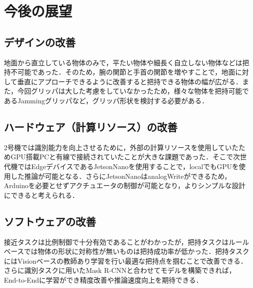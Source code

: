 \section{今後の展望}
\subsection*{デザインの改善}
地面から直立している物体のみで，平たい物体や細長く自立しない物体などは把持不可能であった．そのため，腕の関節と手首の関節を増やすことで，地面に対して垂直にアプローチできるように改善すると把持できる物体の幅が広がる．また，今回グリッパは大した考慮をしていなかったため，様々な物体を把持可能であるJammingグリッパ\cite{jamminggripper}など，グリッパ形状を検討する必要がある．

\subsection*{ハードウェア（計算リソース）の改善}
2号機では識別能力を向上させるために，外部の計算リソースを使用していたためGPU搭載PCと有線で接続されていたことが大きな課題であった．そこで次世代機ではEdgeデバイスであるJetsonNanoを使用することで，localでもGPUを使用した推論が可能となる．さらにJetsonNanoはanalogWriteができるため，Arduinoを必要とせずアクチュエータの制御が可能となり，よりシンプルな設計にできると考えられる．

\subsection*{ソフトウェアの改善}
接近タスクは比例制御で十分有効であることがわかったが，把持タスクはルールベースでは物体の形状に対称性が無いものは把持成功率が低かった．把持タスクにはVisionベースの教師あり学習を行い最適な把持点を掴むことで改善できる．さらに識別タスクに用いたMask R-CNNと合わせてモデルを構築できれば，End-to-Endに学習ができ精度改善や推論速度向上を期待できる．
